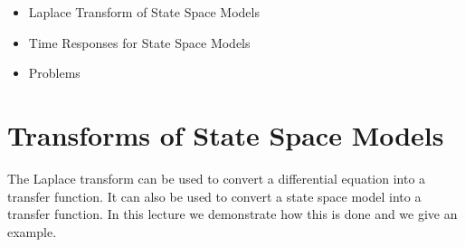 \def\FileDate{99/10/06}
\def\FileVersion{1.2}

\begin{slide}
   \begin{itemize}
   	\item Laplace Transform of State Space Models
   	\item Time Responses for State Space Models
   	\item Problems
   \end{itemize}
\end{slide}

\section*{Transforms of State Space Models} %
\label{sec:transforms_of_state_space_models}

The Laplace transform can be used to convert a differential equation
into a transfer function. It can also be used to convert a state space
model into a transfer function. In this lecture we demonstrate how
this is done and we give an example.

\ifslidesonly
\begin{slide}
  
\end{slide}
\fi


\ifslidesonly
\begin{slide}
  
\end{slide}
\fi


\ifslidesonly
\begin{slide}
  
\end{slide}
\fi

\ifslidesonly
  \begin{slide}
    
  \end{slide}
\fi


